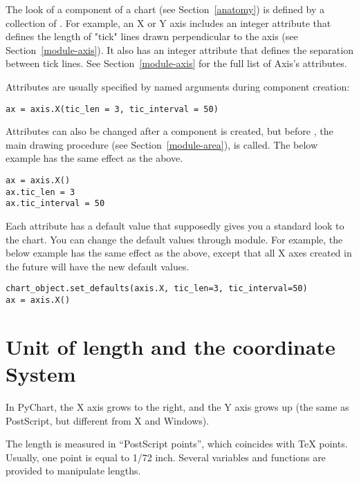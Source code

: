\documentclass{howto}
\newcommand{\pychart}{PyChart}
\newcommand{\xref}[1]{See Section~\ref{#1}}
\newcommand{\pxref}[1]{see Section~\ref{#1}}
\begin{document}
The look of a component of a chart (\pxref{anatomy}) is defined by a
collection of .  For example, an X or Y axis
includes an integer  attribute
that defines
the length of "tick" lines drawn perpendicular to the axis (\pxref{module-axis}). It also has
an integer  attribute that defines the separation
between tick lines.  \xref{module-axis} for the full list of Axis's attributes.

Attributes are usually specified by named arguments during component creation:

\begin{verbatim}
ax = axis.X(tic_len = 3, tic_interval = 50)
\end{verbatim}

\noindent
Attributes can also be changed after a component is created, but before
, the main drawing procedure (\pxref{module-area}), is called.
The below example has the same effect as the above.

\begin{verbatim}
ax = axis.X()
ax.tic_len = 3
ax.tic_interval = 50
\end{verbatim}


Each attribute has a default value that supposedly gives you a standard
look to the chart. You can change the default values through
 module. For example, the below example has the same
effect as the above, except that all X axes created in the future will
have the new default values.


\begin{verbatim}
chart_object.set_defaults(axis.X, tic_len=3, tic_interval=50)
ax = axis.X()
\end{verbatim}

\section{Unit of length and the coordinate System}\label{unit}


In \pychart{}, the X axis grows to the right, and the Y axis grows up
(the same as PostScript, but different from X and Windows).

The length is measured in ``PostScript points'', which coincides with \TeX{}
points. Usually, one point is equal to 1/72 inch.  Several variables and
functions are provided to manipulate lengths.
\end{document}

